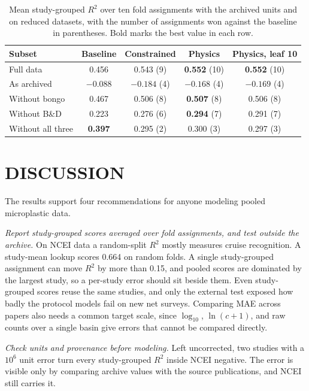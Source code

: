 \documentclass[12pt,a4paper]{report}
\newcommand{\Rsq}{$R^2$}
\begin{document}
\begin{table}[!htbp]
\centering
\caption[Robustness of the fixes to archived units and reduced datasets]{Mean study-grouped \Rsq{} over ten fold assignments with the archived units and on reduced datasets, with the number of assignments won against the baseline in parentheses. Bold marks the best value in each row.}
\label{tab:robustness}
\setlength{\tabcolsep}{3pt}
\begin{tabular}{@{}lcccc@{}}
\toprule
Subset & Baseline & Constrained & Physics & Physics, leaf 10\\
\midrule
Full data & 0.456 & 0.543 (9) & \textbf{0.552} (10) & \textbf{0.552} (10)\\
As archived & $\mathbf{-0.088}$ & $-0.184$ (4) & $-0.168$ (4) & $-0.169$ (4)\\
Without bongo & 0.467 & 0.506 (8) & \textbf{0.507} (8) & 0.506 (8)\\
Without B\&D & 0.223 & 0.276 (6) & \textbf{0.294} (7) & 0.291 (7)\\
Without all three & \textbf{0.397} & 0.295 (2) & 0.300 (3) & 0.297 (3)\\
\bottomrule
\end{tabular}
\end{table}

\chapter{DISCUSSION}

The results support four recommendations for anyone modeling pooled microplastic data.

\emph{Report study-grouped scores averaged over fold assignments, and test outside the archive.} On NCEI data a random-split \Rsq{} mostly measures cruise recognition. A study-mean lookup scores 0.664 on random folds. A single study-grouped assignment can move \Rsq{} by more than 0.15, and pooled scores are dominated by the largest study, so a per-study error should sit beside them. Even study-grouped scores reuse the same studies, and only the external test exposed how badly the protocol models fail on new net surveys. Comparing MAE across papers also needs a common target scale, since $\log_{10}$, $\ln(c+1)$, and raw counts over a single basin give errors that cannot be compared directly.

\emph{Check units and provenance before modeling.} Left uncorrected, two studies with a $10^6$ unit error turn every study-grouped \Rsq{} inside NCEI negative. The error is visible only by comparing archive values with the source publications, and NCEI still carries it.
\end{document}
